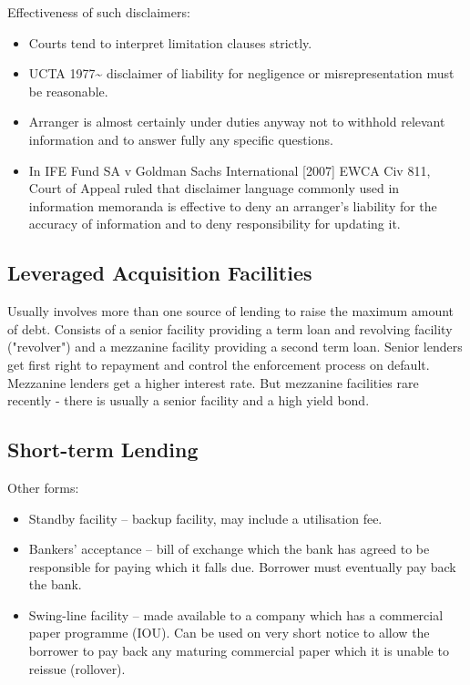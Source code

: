 \documentclass[
]{article}
\providecommand{\tightlist}{%
  \setlength{\itemsep}{0pt}\setlength{\parskip}{0pt}}
\begin{document}
Effectiveness of such disclaimers:

\begin{itemize}
\tightlist
\item
  Courts tend to interpret limitation clauses strictly.
\item
  UCTA 1977\textasciitilde{} disclaimer of liability for negligence or
  misrepresentation must be reasonable.
\item
  Arranger is almost certainly under duties anyway not to withhold
  relevant information and to answer fully any specific questions.
\item
  In IFE Fund SA v Goldman Sachs International {[}2007{]} EWCA Civ 811,
  Court of Appeal ruled that disclaimer language commonly used in
  information memoranda is effective to deny an arranger's liability for
  the accuracy of information and to deny responsibility for updating
  it.
\end{itemize}

\hypertarget{leveraged-acquisition-facilities}{%
\subsection{Leveraged Acquisition
Facilities}\label{leveraged-acquisition-facilities}}

Usually involves more than one source of lending to raise the maximum
amount of debt. Consists of a senior facility providing a term loan and
revolving facility ("revolver") and a mezzanine facility providing a
second term loan. Senior lenders get first right to repayment and
control the enforcement process on default. Mezzanine lenders get a
higher interest rate. But mezzanine facilities rare recently - there is
usually a senior facility and a high yield bond.

\hypertarget{short-term-lending}{%
\subsection{Short-term Lending}\label{short-term-lending}}

Other forms:

\begin{itemize}
\tightlist
\item
  Standby facility -- backup facility, may include a utilisation fee.
\item
  Bankers' acceptance -- bill of exchange which the bank has agreed to
  be responsible for paying which it falls due. Borrower must eventually
  pay back the bank.
\item
  Swing-line facility -- made available to a company which has a
  commercial paper programme (IOU). Can be used on very short notice to
  allow the borrower to pay back any maturing commercial paper which it
  is unable to reissue (rollover).
\end{itemize}
\end{document}
